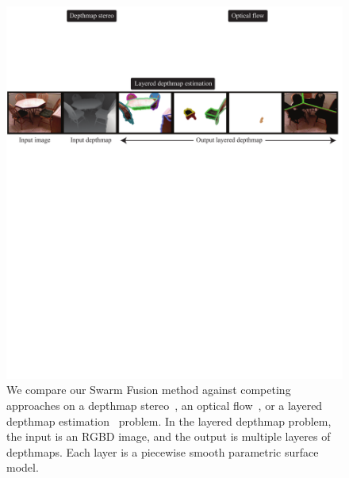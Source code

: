 %
\begin{figure}[tb]
 \includegraphics[width=\columnwidth]{figure/problem.pdf} \caption{We
 compare our Swarm Fusion method against competing approaches on a
 depthmap stereo~\cite{middle_bury_stereo}, an optical
 flow~\cite{middlebury_optical_flow}, or a layered depthmap
 estimation~\cite{layered_depthmap} problem. In the layered depthmap
 problem, the input is an RGBD image, and the output is multiple layeres
 of depthmaps. Each layer is a piecewise smooth parametric surface
 model.}\label{fig:problem}
\end{figure}



